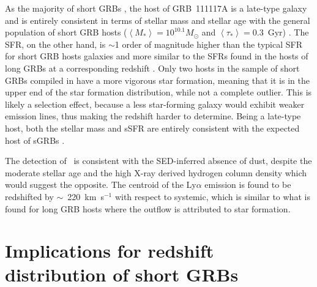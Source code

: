 \documentclass{aa}    %
\begin{document}
As the majority of short GRBs \citep{Fong2013b}, the host of GRB~111117A is a
late-type galaxy and is entirely consistent in terms of stellar mass and stellar
age with the general population of short GRB hosts ($\left\langle M _*
\right\rangle = 10^{10.1} M_{\odot}$ and $\left\langle \tau _* \right\rangle =
0.3 $~Gyr) \citet{Leibler2010}. The SFR, on the other hand, is $\sim$1 order of
magnitude higher than the typical SFR for short GRB hosts galaxies
\citep{Berger2014} and more similar to the SFRs found in the hosts of long GRBs
at a corresponding redshift \citep{Kruhler2015}. Only two hosts in the sample of
short GRBs compiled in \citet{Berger2014} have a more vigorous star formation,
meaning that it is in the upper end of the star formation distribution,
while not a complete outlier. This is likely a selection effect, because a less
star-forming galaxy would exhibit weaker emission lines, thus making the
redshift harder to determine. Being a late-type host, both the stellar mass and
sSFR are entirely consistent with the expected host of
sGRBs \citep{Behroozi2014}.

The detection of \lya~is consistent with the SED-inferred absence of dust, despite
the moderate stellar age and the high X-ray derived hydrogen column density
which would suggest the opposite. The centroid of the Ly$\alpha$ emission is
found to be redshifted by $\sim$~220~km~s$^{-1}$ with respect to systemic, which
is similar to what is found for long GRB hosts \citep{Milvang-Jensen2012a} where
the outflow is attributed to star formation.




\section{Implications for redshift distribution of short GRBs}
\end{document}
